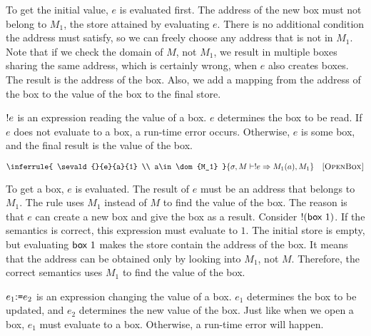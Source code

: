 To get the initial value, $e$ is evaluated first. The address of the new
box must not belong to $M_1$, the store attained by evaluating $e$.
There is no additional condition the address must satisfy, so we can freely
choose any address that is not in $M_1$.
Note that if we check the domain of $M$, not $M_1$, we result in multiple
boxes sharing the same address, which is certainly wrong, when $e$ also creates
boxes.
The result is the address of the box. Also, we add a mapping from the address of
the box to the value of the box to the final store.

$!e$ is an expression reading the value of a box. $e$ determines the box
to be read. If $e$ does not evaluate to a box, a run-time error occurs.
Otherwise, $e$ is some box, and the final result is the value of the box.


\vspace{-1em}

\[
  \inferrule
  {
    \sevald{}{e}{a}{1} \\
    a\in \dom{M_1}
  }
  { \seval{\sigma}{M}{\ederef{e}}{M_1(a)}{M_1} }
  \quad\textsc{[OpenBox]}
\]

To get a box, $e$ is evaluated. The result of $e$ must be an address that
belongs to $M_1$. The rule uses $M_1$ instead
of $M$ to find the value of the box. The reason is that $e$ can create a new
box and give the box as a result. Consider $!(\textsf{box}\ 1)$. If the semantics
is correct, this expression must evaluate to $1$. The initial
store is empty, but evaluating $\textsf{box}\ 1$ makes the store contain the address of
the box. It means that the address can be obtained only by looking into $M_1$,
not $M$. Therefore, the correct semantics uses $M_1$ to find the value of the
box.

$e_1{:}\texttt{=} e_2$ is an expression changing the value of a box. $e_1$ determines the box
to be updated, and $e_2$ determines the new value of the box. Just like when we
open a box, $e_1$ must evaluate to a box. Otherwise, a run-time error will happen.

